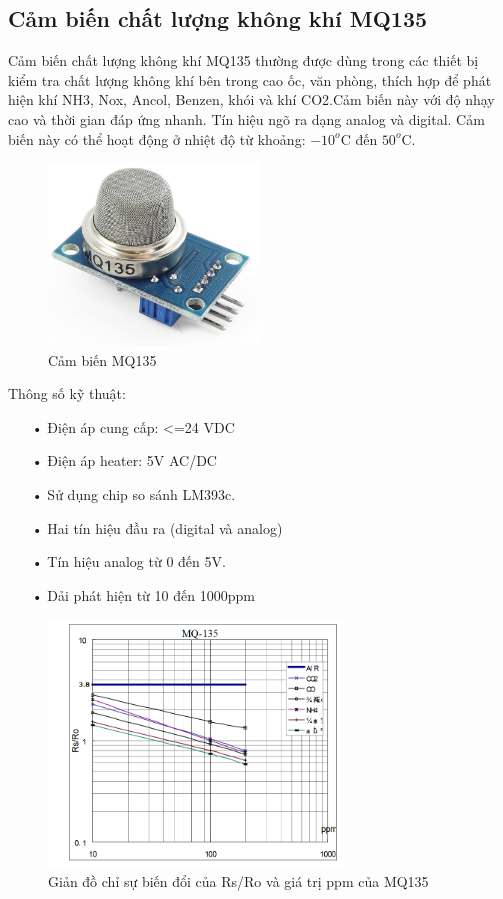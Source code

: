 \subsection{Cảm biến chất lượng không khí MQ135} 
Cảm biến chất lượng không khí MQ135 thường được dùng trong các thiết bị kiểm tra chất lượng không khí bên trong cao ốc, văn phòng, thích hợp để phát hiện khí NH3, Nox, Ancol, Benzen, khói và khí CO2.Cảm biến này với độ nhạy cao và thời gian đáp ứng nhanh. Tín hiệu ngõ ra dạng analog và digital. Cảm biến này có thể hoạt động ở nhiệt độ từ khoảng: $-10^{o}$C đến $50^{o}$C.
\begin{figure}[H]
	\centering    
	\includegraphics[width=0.5\textwidth]{mq135}
	\caption[Cảm biến MQ135]{Cảm biến MQ135}
	\label{fig:mq135}
\end{figure}
Thông số kỹ thuật:
\begin{itemize}
\item[•]Điện áp cung cấp: <=24 VDC
\item[•]Điện áp heater: 5V AC/DC
\item[•]Sử dụng chip so sánh LM393c.
\item[•]Hai tín hiệu đầu ra (digital và analog)
\item[•]Tín hiệu analog từ 0 đến 5V.
\item[•]Dải phát hiện từ 10 đến 1000ppm
\end{itemize}

\begin{figure}[H]
	\centering    
	\includegraphics[width=0.7\textwidth]{mq135_mqh1}
	\caption[Giản đồ chỉ sự biến đổi của Rs/Ro và giá trị ppm của MQ135]{Giản đồ chỉ sự biến đổi của Rs/Ro và giá trị ppm của MQ135}
	\label{fig:mq135_mqh1}
\end{figure}

